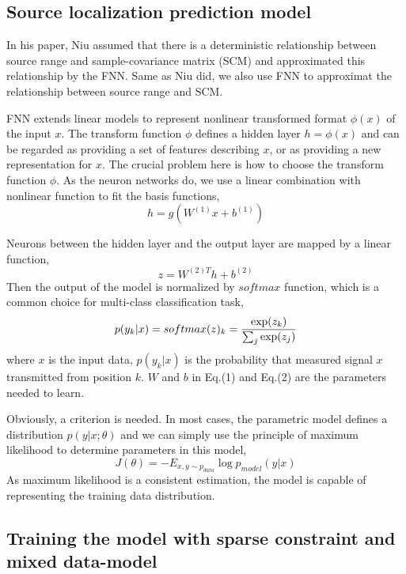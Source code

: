 \subsection{Source localization prediction model}
In his paper\cite{niu2017source}, Niu assumed that there is a deterministic relationship between source range and sample-covariance matrix (SCM) and approximated this relationship by the FNN. Same as Niu did, we also use FNN to approximat the relationship between
source range and SCM.

FNN extends linear models to represent nonlinear transformed format $\phi(x)$ of the input $x$. The transform function $\phi$ defines a hidden layer $h=\phi(x)$ and can be regarded as providing a set of features describing $x$, or as providing a new representation for $x$. The crucial problem here is how to choose the transform function $\phi$. As the neuron networks do, we use a linear combination with nonlinear function to fit the basis functions,
\begin{equation}
h = g(W^{(1)}x + b^{(1)})
\end{equation}

Neurons between the hidden layer and the output layer are mapped by a linear function,
\begin{equation}
z = {W^{(2)T}}h + {b^{(2)}}
\end{equation}
Then the output of the model is normalized by $ softmax $ function, which is a common choice for multi-class classification task\cite{bishop2006pattern},
\begin{equation}
p({y_k}|x) = softmax {(z)_k} = {{\exp ({z_k})} \over {\sum\nolimits_j {\exp ({z_j})} }}
\end{equation}
where $x$ is the input data, $p({y_k}|x)$ is the probability that measured signal $x$ transmitted from position $k$. $W$ and $b$ in Eq.(1) and Eq.(2) are the parameters needed to learn.

Obviously, a criterion is needed. In most cases, the parametric model defines a distribution $p(y|x;\theta)$ and we can simply use the principle of maximum likelihood to determine parameters in this model,
\begin{equation}
J(\theta ) =  - {E_{x,y \sim {p_{data}}}}\log {p_{model}}(y|x)
\end{equation}
As maximum likelihood is a consistent estimation, the model is capable of representing the training data distribution.

\subsection{Training the model with sparse constraint and mixed data-model}

